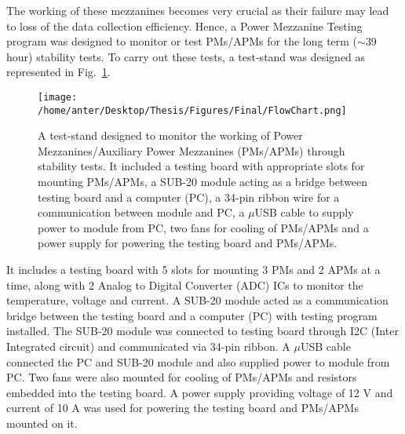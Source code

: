 The working of these mezzanines becomes very crucial as their failure may lead to loss of the data collection efficiency. Hence, a Power Mezzanine Testing program was designed to monitor or test \mhtr PMs/APMs for the long term ($\sim$39 hour) stability tests. To carry out these tests, a test-stand was designed as represented in Fig.~\ref{fig:flowchart}. 
\begin{figure}[!h]
\begin{center}
\vspace*{6mm} 
\hspace*{-3mm}
\texttt{[image: /home/anter/Desktop/Thesis/Figures/Final/FlowChart.png]}\\
\vspace*{4mm}
\caption[A test-stand designed to monitor the working of Power Mezzanines/Auxiliary Power Mezzanines (PMs/APMs) through stability tests.]{A test-stand designed to monitor the working of Power Mezzanines/Auxiliary Power Mezzanines (PMs/APMs) through stability tests. It included a testing board with appropriate slots for mounting PMs/APMs, a SUB-20 module acting as a bridge between testing board and a computer (PC), a 34-pin ribbon wire for a communication between module and PC, a $\mu$USB cable to supply power to module from PC, two fans for cooling of PMs/APMs and a power supply for powering the testing board and PMs/APMs.}
\label{fig:flowchart}
\end{center}
\end{figure} It includes a testing board with 5 slots for mounting 3 PMs and 2 APMs at a time, along with 2 Analog to Digital Converter (ADC) ICs to monitor the temperature, voltage and current. A SUB-20 module acted as a communication bridge between the testing board and a computer (PC) with testing program installed. The SUB-20 module was connected to testing board through I2C (Inter Integrated circuit) and communicated via 34-pin ribbon. A $\mu$USB cable connected the PC and SUB-20 module and also supplied power to module from PC. Two fans were also mounted for cooling of PMs/APMs and resistors embedded into the testing board. A power supply providing voltage of 12 V and current of 10 A was used for powering the testing board and PMs/APMs mounted on it.  

